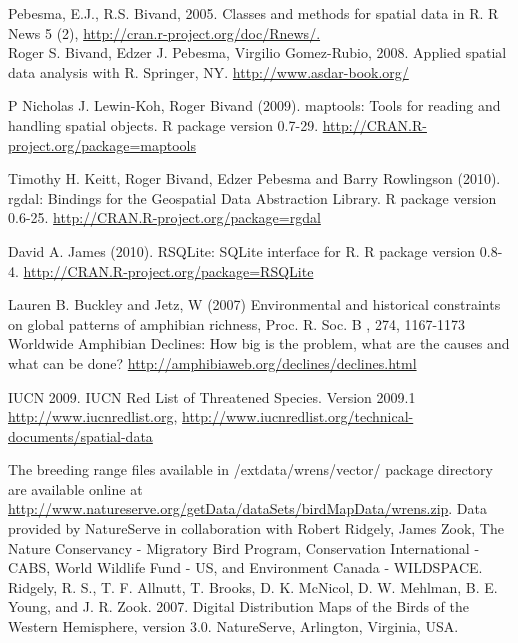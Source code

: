 \documentclass[ a4paper ]{article}
\begin{document}
	
\pagebreak		
\begin{thebibliography}{1}

	Pebesma, E.J., R.S. Bivand, 2005. Classes and methods for spatial data in R. R News 5 (2), 
			\url{http://cran.r-project.org/doc/Rnews/.}\\
	Roger S. Bivand, Edzer J. Pebesma, Virgilio Gomez-Rubio, 2008. Applied spatial data analysis with R. Springer, NY. 
			\url{http://www.asdar-book.org/}
			
	P Nicholas J. Lewin-Koh, Roger Bivand (2009). maptools: Tools for reading and handling spatial objects. R package version 0.7-29. \url{http://CRAN.R-project.org/package=maptools}			

	Timothy H. Keitt, Roger Bivand, Edzer Pebesma and Barry Rowlingson (2010). rgdal: Bindings for the Geospatial Data
	Abstraction Library. R package version 0.6-25. \url{http://CRAN.R-project.org/package=rgdal }

 David A. James (2010). RSQLite: SQLite interface for R. R package version 0.8-4. \url{http://CRAN.R-project.org/package=RSQLite}
  
Lauren B. Buckley and Jetz, W (2007) Environmental and historical constraints on global patterns of amphibian richness, Proc. R. Soc. B , 274, 1167-1173
Worldwide Amphibian Declines: How big is the problem, what are the causes and what can be done?
\url{http://amphibiaweb.org/declines/declines.html}

IUCN 2009. IUCN Red List of Threatened Species. Version 2009.1 
\url{http://www.iucnredlist.org}, \url{http://www.iucnredlist.org/technical-documents/spatial-data}

	 The breeding range files available in /extdata/wrens/vector/  package directory are available online at \url{http://www.natureserve.org/getData/dataSets/birdMapData/wrens.zip}. Data provided by NatureServe in collaboration with Robert Ridgely, James Zook, The Nature Conservancy - Migratory Bird Program, Conservation International - CABS, World Wildlife Fund - US, and Environment Canada - WILDSPACE.\\
Ridgely, R. S., T. F. Allnutt, T. Brooks, D. K. McNicol, D. W. Mehlman, B. E. Young, and J. R. Zook. 2007. Digital Distribution Maps of the Birds of the Western Hemisphere, version 3.0. NatureServe, Arlington, Virginia, USA.


\end{thebibliography}
\end{document}
